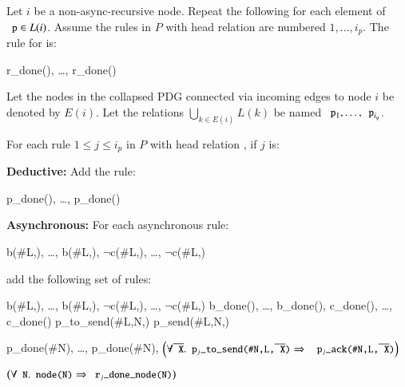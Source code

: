 Let $i$ be a non-async-recursive node.  Repeat the following for each element of $\dedalus{p} \in L(i)$.
Assume the rules in $P$ with head relation
 are numbered $1, \ldots, i_p$.  The rule for 
is:

\begin{Drules}
        {r_done(), \ldots, r_done()}
\end{Drules}

Let the nodes in the collapsed PDG connected via incoming edges to node $i$ be denoted by $E(i)$.  Let the relations $\bigcup_{k \in E(i)} L(k)$ be named $\dedalus{p}_1, \ldots, \dedalus{p}_{i_q}$.

For each rule $1 \leq j \leq i_p$ in $P$ with head relation , if $j$ is:

\noindent
\textbf{Deductive:}
Add the rule:

\begin{Drules}
        {p_done(), \ldots, p_done()}
\end{Drules}

\noindent
\textbf{Asynchronous:}
For each asynchronous rule:

\begin{Drules}
        {b(#L,), \ldots, b(#L,), $\lnot$c(#L,), \ldots, $\lnot$c(#L,)}
\end{Drules}

add the following set of rules:

\begin{Drules}
      {b(#L,), \ldots, b(#L,), $\lnot$c(#L,), \ldots, $\lnot$c(#L,)}
      {b_done(), \ldots, b_done(), c_done(), \ldots, c_done()}
      {p_to_send(#L,N,)}
      {p_send(#L,N,)}

      {p_done(#N), \ldots, p_done(#N), \(\left(\forall \od{X} . \dedalus{p\sub{j}_to_send(#N,L,\od{X})} \Rightarrow \right.\) \(\left. \dedalus{p\sub{j}_ack(#N,L,\od{X})}\right)\)}

      {\(\left(\forall \dedalus{N} . \dedalus{node(N)} \Rightarrow \dedalus{r\sub{j}_done_node(N)}\right)\)}
\end{Drules}

